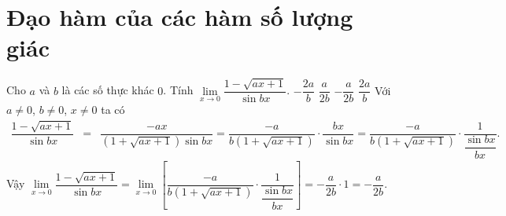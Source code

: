 \section{Đạo hàm của các hàm số lượng giác}
\begin{ex}%
 Cho $a$ và $b$ là các số thực khác $0$. Tính $\lim\limits_{x \to 0} \dfrac{1-\sqrt{ax+1}}{\sin bx}$.
 \choice
  {$-\dfrac{2a}{b}$}
  {$\dfrac{a}{2b}$}
  {\True $-\dfrac{a}{2b}$}
  {$\dfrac{2a}{b}$}
 \loigiai
  {
  Với $a \neq 0$, $b \neq 0$, $x \neq 0$ ta có
  \begin{eqnarray*}
   \dfrac{1-\sqrt{ax+1}}{\sin bx} &=& \dfrac{-ax}{\left(1+\sqrt{ax+1}\right)\sin bx} = \dfrac{-a}{b\left(1+\sqrt{ax+1}\right)} \cdot \dfrac{bx}{\sin bx}
   = \dfrac{-a}{b\left(1+\sqrt{ax+1}\right)} \cdot \dfrac{1}{\dfrac{\sin bx}{bx}}.
  \end{eqnarray*}
  Vậy $\lim\limits_{x \to 0} \dfrac{1-\sqrt{ax+1}}{\sin bx} = \lim\limits_{x \to 0} \left[ \dfrac{-a}{b\left(1+\sqrt{ax+1}\right)} \cdot \dfrac{1}{\dfrac{\sin bx}{bx}} \right] = -\dfrac{a}{2b} \cdot 1 = -\dfrac{a}{2b}$.
  }
\end{ex}

